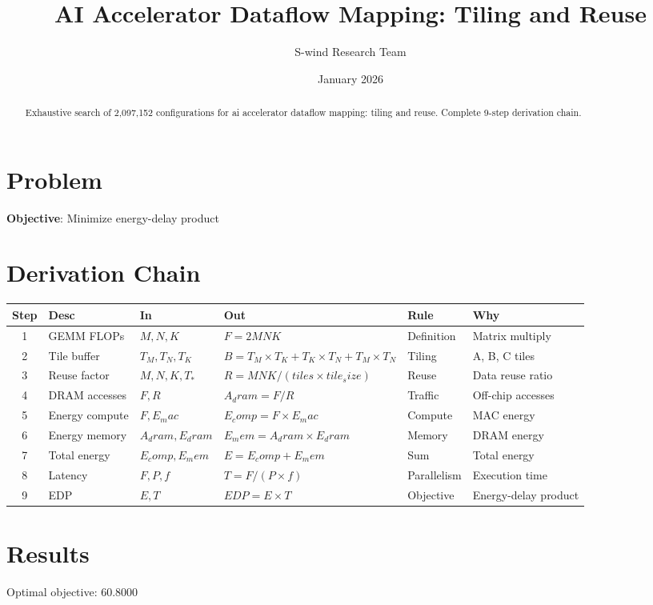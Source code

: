 \documentclass[11pt]{article}
\title{AI Accelerator Dataflow Mapping: Tiling and Reuse}
\author{S-wind Research Team}
\date{January 2026}
\begin{document}
\maketitle

\begin{abstract}
Exhaustive search of 2,097,152 configurations for ai accelerator dataflow mapping: tiling and reuse. Complete 9-step derivation chain.
\end{abstract}

\section{Problem}
\textbf{Objective}: Minimize energy-delay product

\section{Derivation Chain}
\begin{longtable}{|c|p{2cm}|p{2cm}|p{3cm}|p{2cm}|p{3cm}|}
\hline
Step & Desc & In & Out & Rule & Why\\\hline\endhead
1 & GEMM FLOPs & $M, N, K$ & $F = 2MNK$ & Definition & Matrix multiply\\\hline
2 & Tile buffer & $T_M, T_N, T_K$ & $B = T_M×T_K + T_K×T_N + T_M×T_N$ & Tiling & A, B, C tiles\\\hline
3 & Reuse factor & $M, N, K, T_*$ & $R = MNK/(tiles×tile_size)$ & Reuse & Data reuse ratio\\\hline
4 & DRAM accesses & $F, R$ & $A_dram = F / R$ & Traffic & Off-chip accesses\\\hline
5 & Energy compute & $F, E_mac$ & $E_comp = F × E_mac$ & Compute & MAC energy\\\hline
6 & Energy memory & $A_dram, E_dram$ & $E_mem = A_dram × E_dram$ & Memory & DRAM energy\\\hline
7 & Total energy & $E_comp, E_mem$ & $E = E_comp + E_mem$ & Sum & Total energy\\\hline
8 & Latency & $F, P, f$ & $T = F / (P × f)$ & Parallelism & Execution time\\\hline
9 & EDP & $E, T$ & $EDP = E × T$ & Objective & Energy-delay product\\\hline
\end{longtable}

\section{Results}
Optimal objective: 60.8000
\end{document}

